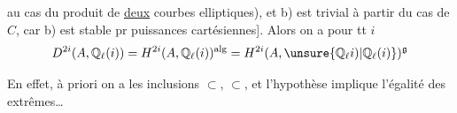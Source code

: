 au cas du produit de \uline{deux} courbes elliptiques), et b) est trivial à partir du cas de $C$, car b) est stable pr  puissances cartésiennes]. Alors on a pour tt $i$
\[
D^{2i}(A,\mathbb{Q}_\ell(i))
=H^{2i}(A,\mathbb{Q}_\ell(i))^{\mathrm{alg}}
=H^{2i}(A,\unsure{\mathbb{Q}_\ell i)|\mathbb{Q}_\ell(i)})^{\mathfrak{g}}
\]

En effet,  à priori on a les inclusions $\subset$, $\subset$, et l'hypothèse implique l'égalité des extrêmes\ldots

